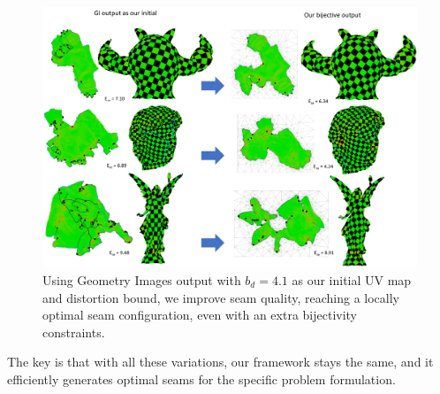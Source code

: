 \begin{figure}[!h]
\centering
\includegraphics[width=\linewidth]{fig/comp_GI_outputAsInit.png}
\caption{Using Geometry Images output with $b_d = 4.1$ as our initial UV map and distortion bound, we improve seam quality, reaching a locally optimal seam configuration, even with an extra bijectivity constraints.}
\label{fig:comp_GI_outputAsInit}
\end{figure}

The key is that with all these variations, our framework stays the same, and it efficiently generates optimal seams for the specific problem formulation.
